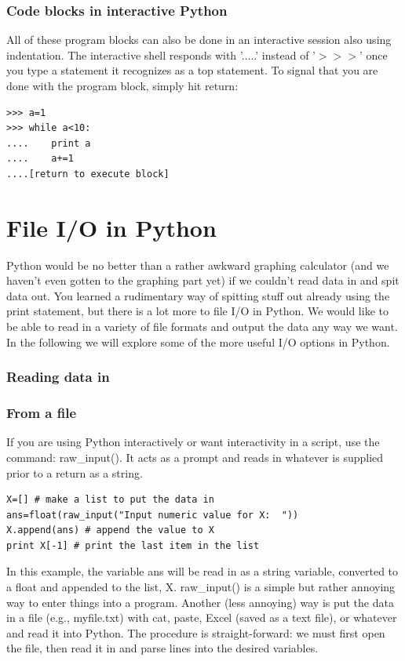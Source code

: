 \documentclass[11pt]{book}
\begin{document}
{{{{\subsubsection{Code blocks in interactive Python}

All of these program blocks can also be done in an interactive session also using indentation.  The interactive shell responds with '.....'  instead of '$>>>$' once you type a statement it recognizes as a top statement.   To signal that you are done with the program block, simply hit return:


{ \color{blue} \begin{verbatim}
>>> a=1
>>> while a<10:
....    print a
....    a+=1
....[return to execute block]
\end{verbatim}}



\section{File I/O in Python}

Python would be no better than a rather awkward graphing calculator (and we haven't even gotten to the graphing part yet) if we couldn't read data in and spit data out.   You learned a rudimentary way of spitting stuff out already using the {\color{blue}print} statement, but there is a lot more to file I/O in Python.  We would like to be able to read in a variety of file formats  and output the data any way we want.  In the following we will explore some of the more useful  I/O options in Python.




\subsubsection{Reading data in}
\subsubsection{From a file}

If you are using Python interactively or want interactivity in a script,  use the command:  {\color{blue}raw\_input()}.  It acts as a prompt and reads in whatever is supplied prior to a return as a string.

{ \color{blue} \begin{verbatim}
X=[] # make a list to put the data in
ans=float(raw_input("Input numeric value for X:  "))
X.append(ans) # append the value to X
print X[-1] # print the last item in the list
\end{verbatim}}
\noindent
In this example, the variable {\color{blue}ans} will be read in as a string variable,  converted to a float and appended to the list, {\color{blue}X}.    {\color{blue}raw\_input()} is a simple but rather annoying way to enter things into a program.
Another (less annoying)  way is  put the data in a file (e.g., myfile.txt) with cat, paste, Excel (saved as a text file), or whatever and read  it into Python.  The procedure is straight-forward: we must first open the file, then read it in and parse lines into the desired variables.

}}}}
\end{document}
